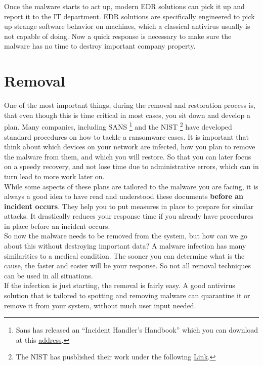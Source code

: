 Once the malware starts to act up, modern EDR %
solutions can pick it up and report it to the IT department.
EDR solutions are specifically engineered to pick up strange software behavior on machines, which a classical antivirus usually is not capable of doing.
Now a quick response is necessary to make sure the malware has no time to destroy important company property.

\section{Removal}

One of the most important things, during the removal and restoration process is, that even though this is time critical in most cases, you sit down and develop a plan.
Many companies, including SANS \footnote{Sans has released an \enquote{Incident Handler's Handbook} which you can download at this \href{https://www.sans.org/white-papers/33901/}{address}. }%
and the NIST \footnote{The NIST has pusblished their work under the following \href{http://dx.doi.org/10.6028/NIST.SP.800-61r2}{Link}. }%
 have developed standard procedures on how to tackle a ransomware cases.
It is important that think about which devices on your network are infected, how you plan to remove the malware from them, and which you will restore.
So that you can later focus on a speedy recovery, and not lose time due to administrative errors, which can in turn lead to more work later on.
\\

While some aspects of these plans are tailored to the malware you are facing, it is always a good idea to have read and understood these documents \textbf{before an incident occurs}.
They help you to put measures in place to prepare for similar attacks.
It drastically reduces your response time if you already have procedures in place before an incident occurs.
\\

So now the malware needs to be removed from the system, but how can we go about this without destroying important data?
A malware infection has many similarities to a medical condition.
The sooner you can determine what is the cause, the faster and easier will be your response.
So not all removal techniques can be used in all situations.
\\

If the infection is just starting, the removal is fairly easy.
A good antivirus solution that is tailored to spotting and removing malware can quarantine it or remove it from your system, without much user input needed.
\\

